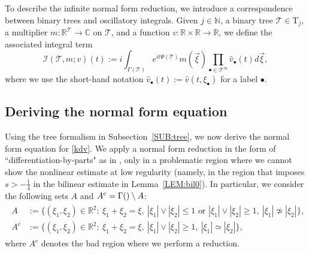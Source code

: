 \documentclass[a4paper,
11pt,  reqno]{amsart}
\makeatletter
\newcommand{\5}{\textup{V}}
\newcommand{\ft}{\widehat}
\theoremstyle{remark}
\newcommand{\R}{\mathbb{R}}
\newcommand{\bbC}{\mathbb{C}}
\newcommand{\bul}{\bullet}
\newcommand{\TT}{\mathcal{T}}
\newcommand{\Tr}{\mathrm{T}}
\newcommand{\G}{\Gamma}
\newcommand{\N}{\mathbb{N}}
\def\<#1>{\csname MH@symb@#1\endcsname}
\newcommand{\Ical}{\mathcal{I}}
\numberwithin{equation}{section}
\numberwithin{theorem}{section}
\makeatother
\begin{document}
To describe the infinite normal form reduction, we introduce a correspondence between binary trees and oscillatory integrals. 
Given $j\in\N$, a binary tree $\TT \in \Tr_j$, a multiplier $m:\R^{\TT}\to \bbC$ on $\TT$, and a
function $v: \R\times \R \to\R$, we define the associated integral term
\begin{equation}\label{eq:defiI}
\Ical(\TT, m; v)(t) :=   i \int_{\G(\TT)}
e^{it\Psi(\TT)}m(\vec{\xi})
\prod_{\bul\in \TT^\infty}  \ft v_\bul (t) d\vec{\xi},
\end{equation}
where 
we use the short-hand notation  $\ft v_\bul(t) := \ft v(t,\xi_\bul)$ for a label $\bul$. 








\subsection{Deriving the normal form equation}\label{sec:nfe}

Using the tree formalism in Subsection~\ref{SUB:tree}, we now derive the normal form equation for \eqref{kdv}.
We apply a normal form reduction in the form of ``differentiation-by-parts" as in \cite{bit}, only in a problematic region where we cannot show the nonlinear estimate at low regularity
(namely, in the region that imposes $s>-\frac14$ in the bilinear estimate in Lemma~\ref{LEM:bil0}).
In particular, we consider the following sets $A$ and $A^c = \G({\<1>}) \setminus A$: 
\begin{align}
\label{A}
\begin{split} 
A & := \big\{ (\xi_{1}, \xi_{2}) \in \R^2: \ \xi_{1}+ \xi_{2} = \xi, \  |\xi_{1}| \lor  |\xi_{2}| \le 1 \text{ or } |\xi_{1}| \lor  |\xi_{2}| \ge 1,  \ |\xi_{1}| \not\simeq |\xi_{2}| \big\}, \\
A^c & := \big\{ (\xi_{1}, \xi_2) \in \R^2: \ \xi_{1}+ \xi_{2} = \xi,  \ |\xi_{1}| \lor |\xi_{2}| \ge 1 , \ |\xi_{1}| \simeq |\xi_{2}| \big\}, 
\end{split}
\end{align}
where $A^c$ denotes the bad region where we perform a reduction. 
\end{document}
